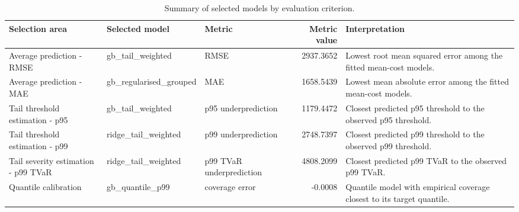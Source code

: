 \begin{table}
\caption{Summary of selected models by evaluation criterion.}
\label{tab:09-selected-model-summary}
\begin{tabular}{lllrl}
\toprule
Selection area & Selected model & Metric & Metric value & Interpretation \\
\midrule
Average prediction - RMSE & gb_tail_weighted & RMSE & 2937.3652 & Lowest root mean squared error among the fitted mean-cost models. \\
Average prediction - MAE & gb_regularised_grouped & MAE & 1658.5439 & Lowest mean absolute error among the fitted mean-cost models. \\
Tail threshold estimation - p95 & gb_tail_weighted & p95 underprediction & 1179.4472 & Closest predicted p95 threshold to the observed p95 threshold. \\
Tail threshold estimation - p99 & ridge_tail_weighted & p99 underprediction & 2748.7397 & Closest predicted p99 threshold to the observed p99 threshold. \\
Tail severity estimation - p99 TVaR & ridge_tail_weighted & p99 TVaR underprediction & 4808.2099 & Closest predicted p99 TVaR to the observed p99 TVaR. \\
Quantile calibration & gb_quantile_p99 & coverage error & -0.0008 & Quantile model with empirical coverage closest to its target quantile. \\
\bottomrule
\end{tabular}
\end{table}
